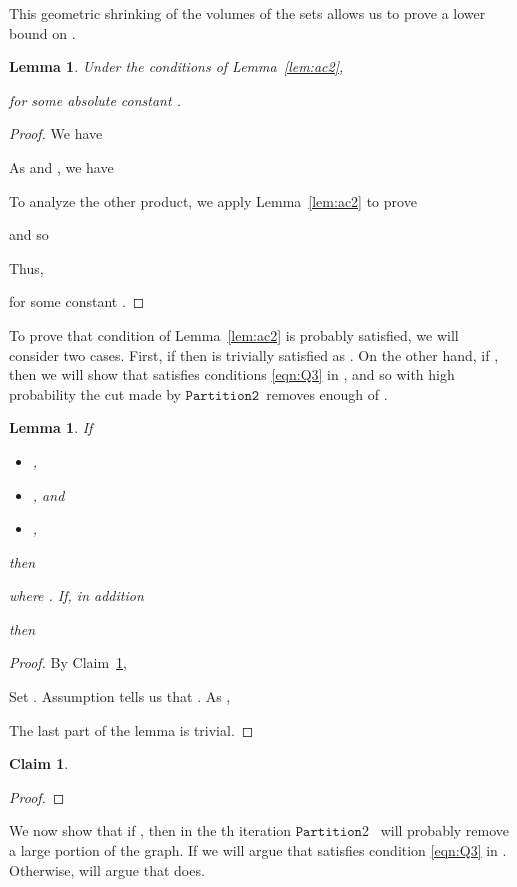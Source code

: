 \documentclass[11pt]{article}
\newtheorem{lemma}[theorem]{Lemma}
\newtheorem{claim}[theorem]{Claim}
\newcommand{\partition}{\ensuremath{\mathtt{Partition}}}
\newcommand{\partitiontwo}{\ensuremath{\mathtt{Partition2}}}
\begin{document}
This geometric shrinking of the volumes of the sets  allows
  us to prove a lower bound on .


\begin{lemma}\label{lem:ac3}
Under the conditions of Lemma~\ref{lem:ac2},

for some absolute constant .
\end{lemma}
\begin{proof}
We have

As  and , we have

To analyze the other product, we apply Lemma~\ref{lem:ac2} to prove

and so

Thus,

for some constant .
\end{proof}

To prove that condition  of Lemma~\ref{lem:ac2} is probably satisfied,
  we will consider two cases.
First, if 
  then  is trivially satisfied as .
On the other hand, if ,
  then we will show that  satisfies conditions \eqref{eqn:Q3}
  in , and so 
  with high probability the
  cut  made by 
  \partitiontwo \ removes enough of .

\begin{lemma}\label{lem:ac4}
If
\begin{itemize}
\item [(a)] , 
\item [(b)] , and
\item [(c)] ,
\end{itemize}
then

where .
If, in addition 

then

\end{lemma}
\begin{proof}
By Claim~\ref{clm:ac0},

Set .
Assumption  tells us that .
As , 

The last part of the lemma is trivial.
\end{proof}

\begin{claim}\label{clm:ac0}

\end{claim}
\begin{proof}

\end{proof}

We now show that if ,
  then in the th iteration \partition2 \ will probably
  remove a large portion of the graph.
If 
  we will argue that  satisfies condition
  \eqref{eqn:Q3} in .
Otherwise, will argue that  does.
\end{document}
